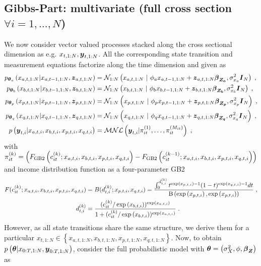 \subsection{Gibbs-Part: multivariate (full cross section $\forall i=1,\ldots,N$)}
We now consider vector valued processes stacked along the cross sectional dimension as e.g. $x_{t, 1:N},\boldsymbol{y}_{t,1:N}$. All the corresponding state transition and measurement equations factorize along the time dimension and given as
\begin{align*}
p_{\boldsymbol{\theta}_a}\left(x_{a,t,1:N}|x_{a,t-1,1:N},\boldsymbol{z}_{a,t,1:N}\right)
&=
\mathcal{N}_{1:N}\left(x_{a,t,1:N}~\lvert~\phi_ax_{a,t-1,1:N}+\boldsymbol{z}_{a,t,1:N}\boldsymbol{\beta}_{\boldsymbol{Z_a}},\sigma_{x_a}^2\boldsymbol{I}_{N}\right)\;,\\
p_{\boldsymbol{\theta}_b}\left(x_{b,t,1:N}|x_{b,t-1,1:N},\boldsymbol{z}_{b,t,1:N}\right)
&=
\mathcal{N}_{1:N}\left(x_{b,t,1:N}~\lvert~\phi_bx_{b,t-1,1:N}+\boldsymbol{z}_{b,t,1:N}\boldsymbol{\beta}_{\boldsymbol{Z_b}},\sigma_{x_b}^2\boldsymbol{I}_{N}\right)\;,\\
p_{\boldsymbol{\theta}_p}\left(x_{p,t,1:N}|x_{p,t-1,1:N},\boldsymbol{z}_{p,t,1:N}\right)
&=
\mathcal{N}_{1:N}\left(x_{p,t,1:N}~\lvert~\phi_px_{p,t-1,1:N}+\boldsymbol{z}_{p,t,1:N}\boldsymbol{\beta}_{\boldsymbol{Z_p}},\sigma_{x_p}^2\boldsymbol{I}_{N}\right)\;,\\
p_{\boldsymbol{\theta}_q}\left(x_{q,t,1:N}|x_{q,t-1,1:N},\boldsymbol{z}_{q,t,1:N}\right)
&=
\mathcal{N}_{1:N}\left(x_{q,t,1:N}~\lvert~\phi_qx_{q,t-1,1:N}+\boldsymbol{z}_{q,t,1:N}\boldsymbol{\beta}_{\boldsymbol{Z_q}},\sigma_{x_q}^2\boldsymbol{I}_{N}\right)\;,\\
p
\left(
\boldsymbol{y}_{t,i}\lvert 
x_{a,t,i},x_{b,t,i},x_{p,t,i},x_{q,t,i}
\right)&=
\mathcal{MNL}\left(\boldsymbol{y}_{t,i}\lvert\pi_{it}^{(1)},\ldots,\pi_{it}^{(M_{it})}\right)\;,
\end{align*}
with $\pi_{it}^{(k)}=\left(F_{\text{GB2}}
\left(c_{it}^{(k)};x_{a,t,i},x_{b,t,i},x_{p,t,i},x_{q,t,i}\right)-F_{\text{GB2}}\left(c_{it}^{(k-1)};x_{a,t,i},x_{b,t,i},x_{p,t,i},x_{q,t,i}\right)\right)$ and income distribution function as a four-parameter GB2
\begin{align*}
F(c_{it}^{(k)};x_{a,t,i},x_{b,t,i},x_{p,t,i},x_{q,t,i})
&=B(d_{t,i}^{(k)};x_{p,t,i},x_{q,t,i})
=
\frac{\int_{0}^{d_{t,i}^{(k)}} t^{\exp\left(x_{p,t,i}\right)-1}(1-t)^{\exp\left(x_{q,t,i}\right)-1}dt}
{\text{B}\left(\exp\left(x_{p,t,i}\right),\exp\left(x_{p,t,i}\right)\right)}\;,\\
d_{t,i}^{(k)} &=\frac{(c_{it}^{(k)}/\exp\left(x_{b,t,i}\right))^{\exp\left(x_{a,t,i}\right)}}{1+(c_{it}^{(k)}/\exp\left(x_{b,t,i}\right))^{\exp\left(x_{a,t,i}\right)}}\;.
\end{align*}
However, as all state transitions share the same structure, we derive them for a particular $x_{t,1:N}\in \left\lbrace x_{a,t,1:N},x_{b,t,1:N},x_{p,t,1:N},x_{q,t,1:N}\right\rbrace$. Now, to obtain $p\left(\boldsymbol{\theta}|x_{0:T,1:N},\boldsymbol{y}_{0:T,1:N}\right)$, consider the full probabilistic model with $\boldsymbol{\theta}=\left(\sigma_X^2,\phi,\boldsymbol{\beta}_{\boldsymbol{Z}}\right)$ as
